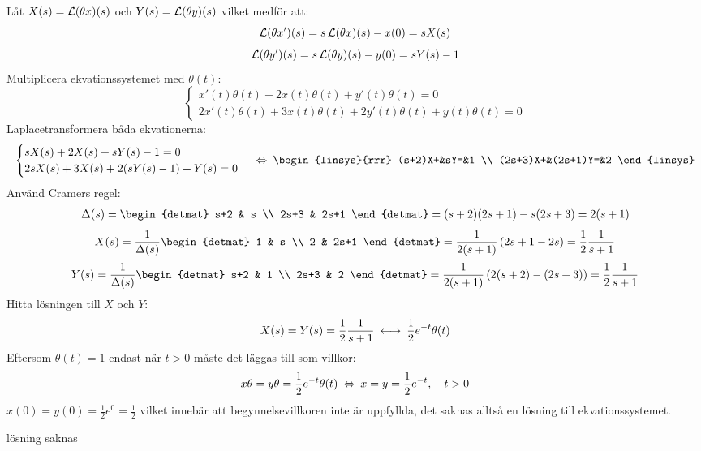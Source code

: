 \begin{task}{5.15}
	Låt $X(s)=\operatorname{\mathcal{L}}(\theta x)(s)$ och $Y(s)=\operatorname{\mathcal{L}}(\theta y)(s)$ vilket medför att:
	\[\operatorname{\mathcal{L}}(\theta x')(s)=s\operatorname{\mathcal{L}}(\theta x)(s)-x(0)=sX(s)\]
	\[\operatorname{\mathcal{L}}(\theta y')(s)=s\operatorname{\mathcal{L}}(\theta y)(s)-y(0)=sY(s)-1\]
	Multiplicera ekvationssystemet med $\theta(t)$:
	\[
	\begin{cases}
	x'(t)\theta(t)+2x(t)\theta(t)+y'(t)\theta(t)=0 \\
	2x'(t)\theta(t)+3x(t)\theta(t)+2y'(t)\theta(t)+y(t)\theta(t)=0
	\end{cases}\]
	Laplacetransformera båda ekvationerna:
	\[
	\begin{cases}
	sX(s)+2X(s)+sY(s)-1=0 \\
	2sX(s)+3X(s)+2(sY(s)-1)+Y(s)=0
	\end{cases} \lra
	\begin{linsys}{rrr}
	(s+2)X+&sY=&1 \\
	(2s+3)X+&(2s+1)Y=&2
	\end{linsys}\]
	Använd Cramers regel:
	\begin{align*}
		\Delta(s)=\begin{detmat}
			s+2 & s \\
			2s+3 & 2s+1
		\end{detmat}=
		(s+2)(2s+1)-s(2s+3)=
		2(s+1)
	\end{align*}
	\begin{align*}
		X(s)=
		\frac{1}{\Delta(s)}\begin{detmat}
			1 & s \\
			2 & 2s+1
		\end{detmat}=
		\frac{1}{2(s+1)}\left(2s+1-2s\right)=
		\frac{1}{2}\*\frac{1}{s+1}
	\end{align*}
	\begin{align*}
		Y(s)=
		\frac{1}{\Delta(s)}\begin{detmat}
			s+2 & 1 \\
			2s+3 & 2
		\end{detmat}=
		\frac{1}{2(s+1)}\left(2(s+2)-(2s+3)\right)=
		\frac{1}{2}\*\frac{1}{s+1}
	\end{align*}
	Hitta lösningen till $X$ och $Y$: 
	\begin{align*}
		X(s)=Y(s)=
		\frac{1}{2}\*\frac{1}{s+1}\llra
		\frac{1}{2}e^{-t}\theta(t)
	\end{align*}
	Eftersom $\theta(t)=1$ endast när $t>0$ måste det läggas till som villkor:
	\[x\theta=y\theta=\frac{1}{2}e^{-t}\theta(t)\lra x=y=\frac{1}{2}e^{-t}\cond{t>0}\]
	$x(0)=y(0)=\frac{1}{2}e^{0}=\frac{1}{2}$ vilket innebär att begynnelsevillkoren inte är uppfyllda, det saknas alltså en lösning till ekvationssystemet.
	
	\ans lösning saknas
\end{task}

